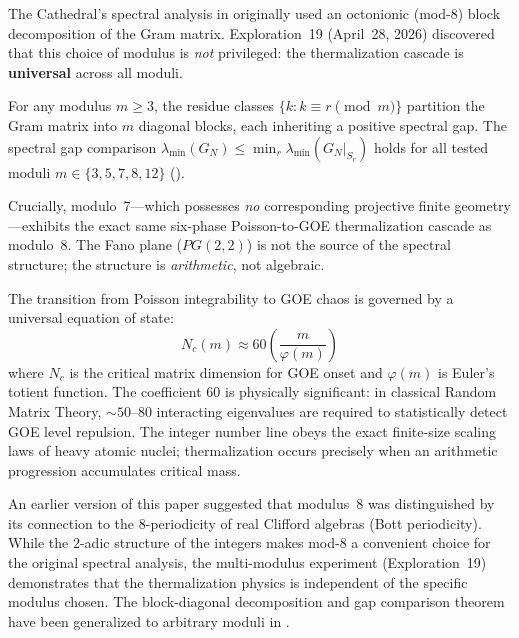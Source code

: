 \documentclass[11pt,a4paper]{article}
\begin{document}
The Cathedral's spectral analysis in 
originally used an octonionic (mod-8) block decomposition of the Gram matrix.
Exploration~19 (April~28, 2026) discovered that this choice of modulus is
\emph{not} privileged: the thermalization cascade is \textbf{universal}
across all moduli.

\begin{principle}
For any modulus $m \geq 3$, the residue classes $\{k : k \equiv r \pmod{m}\}$
partition the Gram matrix into $m$ diagonal blocks, each inheriting a positive
spectral gap. The spectral gap comparison
$\lambda_{\min}(G_N) \leq \min_r \lambda_{\min}(G_N|_{S_r})$
holds for all tested moduli $m \in \{3, 5, 7, 8, 12\}$
().

Crucially, modulo~7---which possesses \emph{no} corresponding projective
finite geometry---exhibits the exact same six-phase Poisson-to-GOE
thermalization cascade as modulo~8. The Fano plane ($PG(2,2)$) is not
the source of the spectral structure; the structure is \emph{arithmetic},
not algebraic.

The transition from Poisson integrability to GOE chaos is governed by a
universal equation of state:
\begin{equation}
  N_c(m) \approx 60 \left(\frac{m}{\varphi(m)}\right)
  \label{eq:universality}
\end{equation}
where $N_c$ is the critical matrix dimension for GOE onset and $\varphi(m)$
is Euler's totient function. The coefficient $60$ is physically significant:
in classical Random Matrix Theory, $\sim 50$--$80$ interacting eigenvalues
are required to statistically detect GOE level repulsion. The integer number
line obeys the exact finite-size scaling laws of heavy atomic nuclei;
thermalization occurs precisely when an arithmetic progression
accumulates critical mass.
\end{principle}

\begin{remark}
An earlier version of this paper suggested that modulus~8 was distinguished
by its connection to the $8$-periodicity of real Clifford algebras
(Bott periodicity). While the $2$-adic structure of the integers makes
mod-8 a convenient choice for the original spectral analysis, the
multi-modulus experiment (Exploration~19) demonstrates that the
thermalization physics is independent of the specific modulus chosen.
The block-diagonal decomposition and gap comparison theorem have been
generalized to arbitrary moduli in .
\end{remark}
\end{document}
